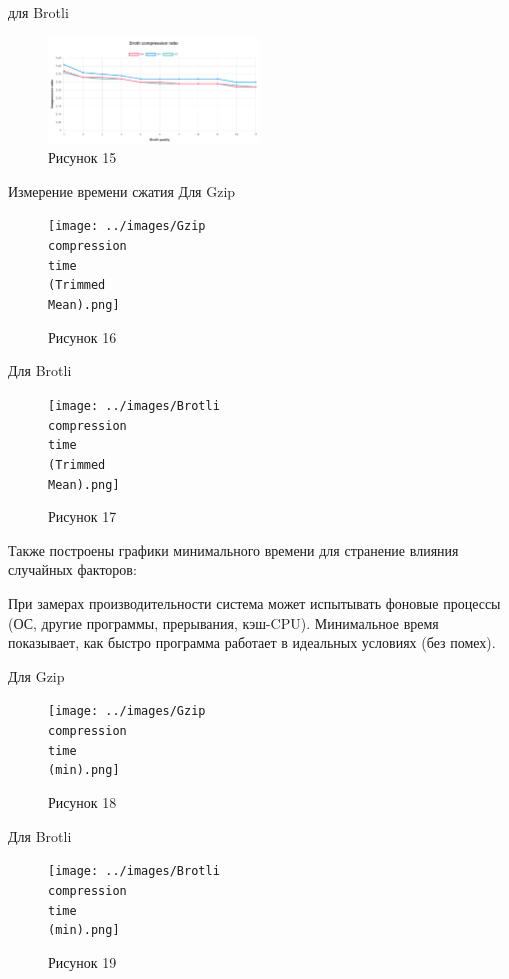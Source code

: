 \documentclass[12pt]{article}
\begin{document}
для Brotli
\begin{figure}[h!]
\centering
\includegraphics[width=0.5\textwidth]{../images/brotli_compressed_ratio.png}
\caption{Рисунок 15}
\end{figure}

Измерение времени сжатия
Для Gzip
\begin{figure}[h!]
\centering
\texttt{[image: ../images/Gzip\\ compression\\ time\\ (Trimmed\\ Mean).png]}
\caption{Рисунок 16}
\end{figure}

Для Brotli
\begin{figure}[h!]
\centering
\texttt{[image: ../images/Brotli\\ compression\\ time\\ (Trimmed\\ Mean).png]}
\caption{Рисунок 17}
\end{figure}

Также построены графики минимального времени для странение влияния случайных факторов:

При замерах производительности система может испытывать фоновые процессы (ОС, другие программы, прерывания, кэш-CPU).
Минимальное время показывает, как быстро программа работает в идеальных условиях (без помех).

Для Gzip
\begin{figure}[h!]
\centering
\texttt{[image: ../images/Gzip\\ compression\\ time\\ (min).png]}
\caption{Рисунок 18}
\end{figure}

Для Brotli
\begin{figure}[h!]
\centering
\texttt{[image: ../images/Brotli\\ compression\\ time\\ (min).png]}
\caption{Рисунок 19}
\end{figure}
\end{document}
